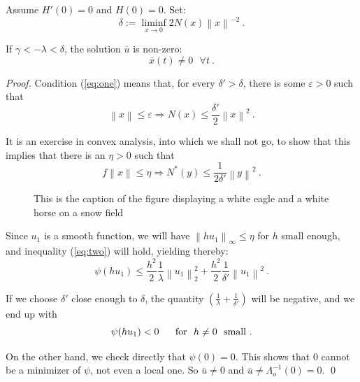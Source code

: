 \documentclass[lnbip]{svmultln}
\begin{document}
%
\begin{proposition}
Assume $H'(0)=0$ and $ H(0)=0$. Set:
\begin{equation}
  \delta := \liminf_{x\to 0} 2 N (x) \left\|x\right\|^{-2}\ .
  \label{eq:one}
\end{equation}

If $\gamma < - \lambda < \delta$,
the solution $\overline{u}$ is non-zero:
\begin{equation}
  \overline{x} (t) \ne 0\ \ \ \forall t\ .
\end{equation}
\end{proposition}
%
\begin{proof}
Condition (\ref{eq:one}) means that, for every
$\delta ' > \delta$, there is some $\varepsilon > 0$ such that
\begin{equation}
  \left\|x\right\| \le \varepsilon \Rightarrow N (x) \le
  \frac{\delta '}{2} \left\|x\right\|^{2}\ .
\end{equation}

It is an exercise in convex analysis, into which we shall not go, to
show that this implies that there is an $\eta > 0$ such that
\begin{equation}
  f\left\|x\right\| \le \eta
  \Rightarrow N^{\ast} (y) \le \frac{1}{2\delta '}
  \left\|y\right\|^{2}\ .
  \label{eq:two}
\end{equation}

\begin{figure}
\vspace{2.5cm}
\caption{This is the caption of the figure displaying a white eagle and
a white horse on a snow field}
\end{figure}

Since $u_{1}$ is a smooth function, we will have
$\left\|hu_{1}\right\|_\infty \le \eta$
for $h$ small enough, and inequality (\ref{eq:two}) will hold,
yielding thereby:
\begin{equation}
  \psi (hu_{1}) \le \frac{h^{2}}{2}
  \frac{1}{\lambda} \left\|u_{1} \right\|_{2}^{2} + \frac{h^{2}}{2}
  \frac{1}{\delta '} \left\|u_{1}\right\|^{2}\ .
\end{equation}

If we choose $\delta '$ close enough to $\delta$, the quantity
$\left(\frac{1}{\lambda} + \frac{1}{\delta '}\right)$
will be negative, and we end up with
\begin{equation}
  \psi (hu_{1}) < 0\ \ \ \ \ {\rm for}\ \ h\ne 0\ \ {\rm small}\ .
\end{equation}

On the other hand, we check directly that $\psi (0) = 0$. This shows
that 0 cannot be a minimizer of $\psi$, not even a local one.
So $\overline{u} \ne 0$ and
$\overline{u} \ne \Lambda_{o}^{-1} (0) = 0$. \qed
\end{proof}
\end{document}
